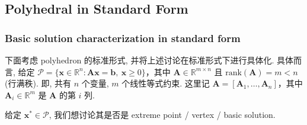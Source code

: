 \documentclass[11pt,UTF8,scheme=plain,fontset=fandol,linespread=1.3]{ctexart}
\numberwithin{figure}{section}
\begin{document}
\subsection{Polyhedral in Standard Form}

\subsubsection{Basic solution characterization in standard form}

下面考虑 polyhedron 的标准形式, 并将上述讨论在标准形式下进行具体化. 具体而言, 给定 $\mathcal{P} = \{\bm{x} \in \mathbb{R}^n: \bm{A}\bm{x} = \bm{b},~ \bm{x} \geq 0\}$，其中 $\bm{A} \in \mathbb{R}^{m \times n}$ 且 $\text{rank}(\bm{A}) = m < n$ (行满秩). 即, 共有 $n$ 个变量, $m$ 个线性等式约束.
这里记 $\bm{A} = [\bm{A}_1, \dots, \bm{A}_n]$，其中 $\bm{A}_i \in \mathbb{R}^m$ 是 $\bm{A}$ 的第 $i$ 列.

给定 $\bm{x}^* \in \mathcal{P}$, 我们想讨论其是否是 extreme point / vertex / basic solution.
\end{document}
